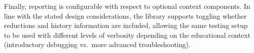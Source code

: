 \begin{justify}
Finally, reporting is configurable with respect to optional context components. In line with the
stated design considerations, the library supports toggling whether reductions and history
information are included, allowing the same testing setup to be used with different levels of
verbosity depending on the educational context (introductory debugging vs.\ more advanced
troubleshooting).
\end{justify}



